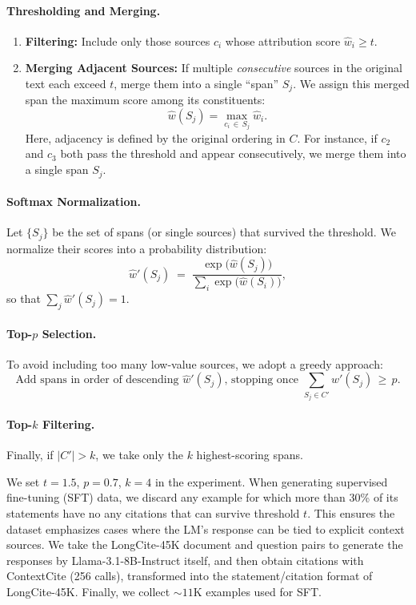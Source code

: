 \paragraph{Thresholding and Merging.}
\begin{enumerate}
    \item \textbf{Filtering:} Include only those sources $c_i$ whose attribution score $\hat{w}_i \ge t$. 
    \item \textbf{Merging Adjacent Sources:} If multiple \textit{consecutive} sources in the original text each exceed $t$, merge them into a single “span” $S_j$. We assign this merged span the maximum score among its constituents:
    \[
    \hat{w}(S_j) = \max_{c_i \,\in\, S_j} \hat{w}_i.
    \]
    Here, adjacency is defined by the original ordering in $C$. For instance, if $c_2$ and $c_3$ both pass the threshold and appear consecutively, we merge them into a single span $S_j$.
\end{enumerate}

\paragraph{Softmax Normalization.}
Let $\{S_j\}$ be the set of spans (or single sources) that survived the threshold. We normalize their scores into a probability distribution:
\[
\hat{w}'(S_j) \;=\; \frac{\exp\bigl(\hat{w}(S_j)\bigr)}{\sum_{i} \exp\bigl(\hat{w}(S_i)\bigr)},
\]
so that $\sum_{j} \hat{w}'(S_j) = 1$.

\paragraph{Top-$p$ Selection.}
To avoid including too many low-value sources, we adopt a greedy approach:
\[
\text{Add spans in order of descending } \hat{w}'(S_j)\text{, stopping once } \sum_{S_j \in C'} \hat{w}'(S_j) \,\ge\, p.
\]

\paragraph{Top-$k$ Filtering.}
Finally, if $|C'| > k$, we take only the $k$ highest-scoring spans. 

We set $t=1.5$, $p=0.7$, $k=4$ in the experiment.
When generating supervised fine-tuning (SFT) data, we discard any example for which more than 30\% of its statements have no any citations that can survive threshold $t$. This ensures the dataset emphasizes cases where the LM’s response can be tied to explicit context sources. 
We take the LongCite-45K document and question pairs to generate the responses by Llama-3.1-8B-Instruct itself, and then obtain citations with ContextCite (256 calls), transformed into the statement/citation format of LongCite-45K. Finally, we collect $\sim11\text{K}$ examples used for SFT.

